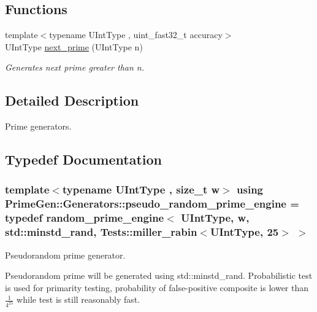 \subsection*{Functions}
\begin{DoxyCompactItemize}
\item 
{\footnotesize template$<$typename U\+Int\+Type , uint\+\_\+fast32\+\_\+t accuracy$>$ }\\U\+Int\+Type \hyperlink{namespace_prime_gen_1_1_generators_a873d71df2a6aa5006ef2be655b0e96bd}{next\+\_\+prime} (U\+Int\+Type n)
\begin{DoxyCompactList}\small\item\em Generates next prime greater than {\ttfamily n}. \end{DoxyCompactList}\end{DoxyCompactItemize}


\subsection{Detailed Description}
Prime generators. 

\subsection{Typedef Documentation}
\hypertarget{namespace_prime_gen_1_1_generators_a376898a01ff7e348018297a4d1147977}{
\subsubsection[{pseudo\+\_\+random\+\_\+prime\+\_\+engine}]{\setlength{\rightskip}{0pt plus 5cm}template$<$typename U\+Int\+Type , size\+\_\+t w$>$ using {\bf Prime\+Gen\+::\+Generators\+::pseudo\+\_\+random\+\_\+prime\+\_\+engine} = typedef {\bf random\+\_\+prime\+\_\+engine}$<$ U\+Int\+Type, w, std\+::minstd\+\_\+rand, {\bf Tests\+::miller\+\_\+rabin}$<$U\+Int\+Type, 25$>$ $>$}}\label{namespace_prime_gen_1_1_generators_a376898a01ff7e348018297a4d1147977}


Pseudorandom prime generator. 

Pseudorandom prime will be generated using {\ttfamily std\+::minstd\+\_\+rand}. Probabilistic test is used for primarity testing, probability of false-\/positive composite is lower than $ \frac{1}{4^{25}} $ while test is still reasonably fast.


